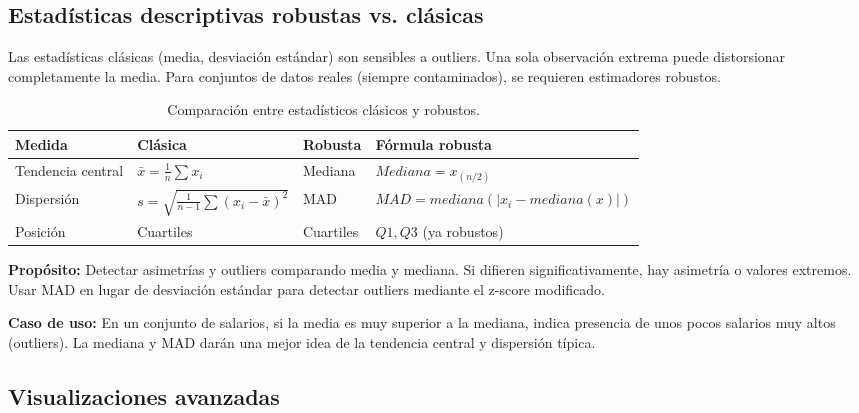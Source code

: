 \documentclass[12pt,a4paper,openany,oneside]{book}
\begin{document}
\subsection{Estadísticas descriptivas robustas vs. clásicas}
Las estadísticas clásicas (media, desviación estándar) son sensibles a outliers. Una sola observación extrema puede distorsionar completamente la media. Para conjuntos de datos reales (siempre contaminados), se requieren estimadores robustos.

\begin{table}[h]
\centering
\begin{tabular}{|l|l|l|l|}
\hline
\textbf{Medida} & \textbf{Clásica} & \textbf{Robusta} & \textbf{Fórmula robusta} \\
\hline
Tendencia central & $\bar{x} = \frac{1}{n}\sum x_i$ & Mediana & $Mediana = x_{(n/2)}$ \\
Dispersión & $s = \sqrt{\frac{1}{n-1}\sum(x_i-\bar{x})^2}$ & MAD & $MAD = mediana(|x_i - mediana(x)|)$ \\
Posición & Cuartiles & Cuartiles & $Q1, Q3$ (ya robustos) \\
\hline
\end{tabular}
\caption{Comparación entre estadísticos clásicos y robustos.}
\end{table}

\textbf{Propósito:} Detectar asimetrías y outliers comparando media y mediana. Si difieren significativamente, hay asimetría o valores extremos. Usar MAD en lugar de desviación estándar para detectar outliers mediante el z-score modificado.

\textbf{Caso de uso:} En un conjunto de salarios, si la media es muy superior a la mediana, indica presencia de unos pocos salarios muy altos (outliers). La mediana y MAD darán una mejor idea de la tendencia central y dispersión típica.

\subsection{Visualizaciones avanzadas}
\end{document}
